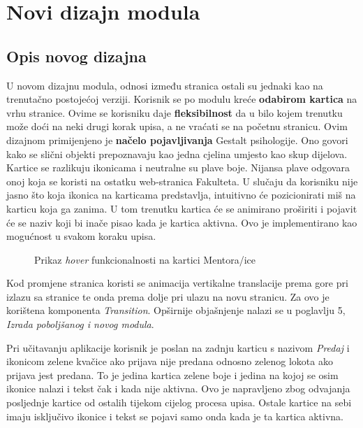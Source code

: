 \documentclass[times, utf8, zavrsni, numeric]{fer}
\begin{document}
        
\chapter{Novi dizajn modula}
    \section{Opis novog dizajna}
    U novom dizajnu modula, odnosi između stranica ostali su jednaki kao na trenutačno postojećoj verziji. Korisnik se po modulu kreće \textbf{odabirom kartica} na vrhu stranice. Ovime se korisniku daje \textbf{fleksibilnost} da u bilo kojem trenutku može doći na neki drugi korak upisa, a ne vraćati se na početnu stranicu. Ovim dizajnom primijenjeno je \textbf{načelo pojavljivanja} Gestalt psihologije. Ono govori kako se slični objekti prepoznavaju kao jedna cjelina umjesto kao skup dijelova. Kartice se razlikuju ikonicama i neutralne su plave boje. Nijansa plave odgovara onoj koja se koristi na ostatku web-stranica Fakulteta. U slučaju da korisniku nije jasno što koja ikonica na karticama predstavlja, intuitivno će pozicionirati miš na karticu koja ga zanima. U tom trenutku kartica će se animirano proširiti i pojavit će se naziv koji bi inače pisao kada je kartica aktivna. Ovo je implementirano kao mogućnost u svakom koraku upisa.
    
    \begin{figure} [H]
      \centering
      \caption{Prikaz \textit{hover} funkcionalnosti na kartici Mentora/ice}
    \end{figure}
    
    Kod promjene stranica koristi se animacija vertikalne translacije prema gore pri izlazu sa stranice te onda prema dolje pri ulazu na novu stranicu. Za ovo je korištena komponenta \textit{Transition}. Opširnije objašnjenje nalazi se u poglavlju 5, \textit{Izrada poboljšanog i novog modula}.
    
    Pri učitavanju aplikacije korisnik je poslan na zadnju karticu s nazivom \textit{Predaj} i ikonicom zelene kvačice ako prijava nije predana odnosno zelenog lokota ako prijava jest predana. To je jedina kartica zelene boje i jedina na kojoj se osim ikonice nalazi i tekst čak i kada nije aktivna. Ovo je napravljeno zbog odvajanja posljednje kartice od ostalih tijekom cijelog procesa upisa. Ostale kartice na sebi imaju isključivo ikonice i tekst se pojavi samo onda kada je ta kartica aktivna.
    
\end{document}
